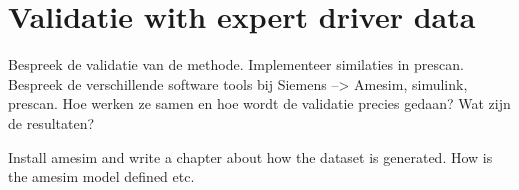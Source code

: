 \chapter{Validatie with expert driver data}
\label{cha:Validation}

Bespreek de validatie van de methode. Implementeer similaties in prescan.
Bespreek de verschillende software tools bij Siemens --> Amesim, simulink, prescan.
Hoe werken ze samen en hoe wordt de validatie precies gedaan? Wat zijn de resultaten?

Install amesim and write a chapter about how the dataset is generated. How is the amesim model defined etc. 



%		





















